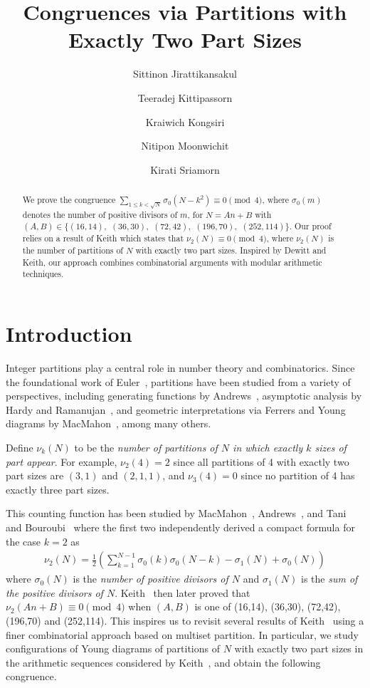 \documentclass[a4paper,oneside,reqno]{amsart}
\title[]{Congruences via Partitions with Exactly Two Part Sizes}
\author{Sittinon Jirattikansakul}
\author{Teeradej Kittipassorn}
\author{Kraiwich Kongsiri}
\author{Nitipon Moonwichit}
\author{Kirati Sriamorn}
\theoremstyle{plain}
\theoremstyle{definition}
\theoremstyle{remark}
\begin{document}
	
	\begin{abstract}
		We prove the congruence $\sum_{1 \leq k < \sqrt{N}} \sigma_0 (N - k^2) \equiv 0 \pmod 4$, where $\sigma_0(m)$ denotes the number of positive divisors of $m$, for $N = An + B$ with $(A,B) \in \{ (16,14),$ $(36,30),$ $(72,42),$ $(196,70),$ $(252,114) \}$. Our proof relies on a result of Keith which states that $\nu_2 (N) \equiv 0 \pmod 4$, where $\nu_2(N)$ is the number of partitions of $N$ with exactly two part sizes. Inspired by Dewitt and Keith, our approach combines combinatorial arguments with modular arithmetic techniques. 
	\end{abstract}
	
	\maketitle
	
	
	
	
	
	
	\section{Introduction}

    Integer partitions play a central role in number theory and combinatorics. Since the foundational work of Euler~\cite{euler1797introductio}, partitions have been studied from a variety of perspectives, including generating functions by Andrews~\cite{andrews1998theory}, asymptotic analysis by Hardy and Ramanujan~\cite{hardy1918asymptotic}, and geometric interpretations via Ferrers and Young diagrams by MacMahon~\cite{macmahon1915combinatory}, among many others. 
	
	Define $\nu_k(N)$ to be the {\em number of partitions of $N$ in which exactly $k$ sizes of part appear}. For example, $\nu_2(4)=2$ since all partitions of 4 with exactly two part sizes are $(3,1)$ and $(2,1,1)$, and $\nu_3(4)=0$ since no partition of 4 has exactly three part sizes.
	
	This counting function has been studied by MacMahon~\cite{macmahon1921divisors}, Andrews~\cite{geandrew1999lattice}, and Tani and Bouroubi~\cite{tani2011enumeration} where the first two independently derived a compact formula for the case $k = 2$ as 
    \begin{align*}
        \nu_2(N) = \frac{1}{2}\left( \sum_{k=1}^{N-1} \sigma_0(k)\sigma_0(N-k) - \sigma_1(N) + \sigma_0(N) \right)
    \end{align*}
    where $\sigma_0(N)$ is the {\em number of positive divisors of $N$} and $\sigma_1(N)$ is the {\em sum of the positive divisors of $N$}. Keith~\cite{keith2017partitions} then later proved that $\nu_2(An+B)\equiv 0\pmod 4$ when $(A,B)$ is one of (16,14), (36,30), (72,42), (196,70) and (252,114). This inspires us to revisit several results of Keith~\cite{dewitt2025combinatorial} using a finer combinatorial approach based on multiset partition. In particular, we study configurations of Young diagrams of partitions of $N$ with exactly two part sizes in the arithmetic sequences considered by Keith~\cite{keith2017partitions}, and obtain the following congruence.
    
\end{document}
